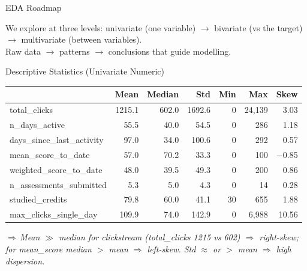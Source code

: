 \documentclass[aspectratio=169,10pt]{beamer}
\newcommand{\hc}[1]{{\bfseries\color{white}#1}}
\newcommand{\tcode}[1]{{\ttfamily #1}}
\newcommand{\takeaway}[1]{\vspace{2pt}\par{\footnotesize\itshape\textcolor{themecol}{$\Rightarrow$\,}#1}}
\begin{document}
\begin{frame}{EDA Roadmap}
  \centering
  \vspace{0.5cm}\par
  \footnotesize We explore at three levels: \alert{univariate} (one variable) $\to$
  \alert{bivariate} (vs the target) $\to$ \alert{multivariate} (between variables).\\
  Raw data $\to$ patterns $\to$ conclusions that guide modelling.
\end{frame}

\begin{frame}{Descriptive Statistics (Univariate Numeric)}
  {\scriptsize
  \setlength{\tabcolsep}{5pt}\renewcommand{\arraystretch}{1.25}
  \begin{tabularx}{\textwidth}{@{}>{\ttfamily}l r r r r r r@{}}
    \toprule
    \rowcolor{themecol}\hc{Feature} & \hc{Mean} & \hc{Median} & \hc{Std} & \hc{Min} & \hc{Max} & \hc{Skew}\\
    \midrule
    total\_clicks             & 1215.1 & 602.0 & 1692.6 & 0 & 24,139 & 3.03\\
    \rowcolor{rowtint}
    n\_days\_active           & 55.5 & 40.0 & 54.5 & 0 & 286 & 1.18\\
    days\_since\_last\_activity & 97.0 & 34.0 & 100.6 & 0 & 292 & 0.57\\
    \rowcolor{rowtint}
    mean\_score\_to\_date      & 57.0 & 70.2 & 33.3 & 0 & 100 & $-$0.85\\
    weighted\_score\_to\_date  & 48.0 & 39.5 & 49.3 & 0 & 200 & 0.86\\
    \rowcolor{rowtint}
    n\_assessments\_submitted  & 5.3 & 5.0 & 4.3 & 0 & 14 & 0.28\\
    studied\_credits          & 79.8 & 60.0 & 41.1 & 30 & 655 & 1.88\\
    \rowcolor{rowtint}
    max\_clicks\_single\_day   & 109.9 & 74.0 & 142.9 & 0 & 6,988 & 10.56\\
    \bottomrule
  \end{tabularx}}
  \takeaway{Mean $\gg$ median for clickstream (total\_clicks 1215 vs 602) $\Rightarrow$ \alert{right-skew}; for \tcode{mean\_score} median $>$ mean $\Rightarrow$ left-skew. Std $\approx$ or $>$ mean $\Rightarrow$ high dispersion.}
\end{frame}
\end{document}
